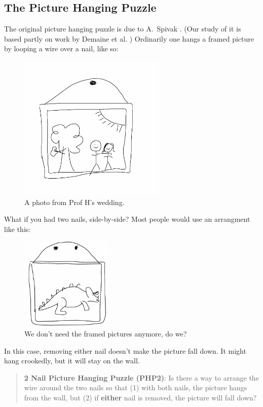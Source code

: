 \documentclass[12pt,letterpaper]{article}
\theoremstyle{definition}
\begin{document}
\subsection*{The Picture Hanging Puzzle}
The original picture hanging puzzle is due to A.~Spivak \cite{Spivak}.
(Our study of it is based partly on work by Demaine et al. \cite{Demaine})
Ordinarily one hangs a framed picture by looping a wire over a nail, like so:
\begin{figure}[h]
    \centering
    \includegraphics[height=2.75in]{phppics/wedding.png}
    \caption{A photo from Prof H's wedding.}
\end{figure}
 
\clearpage
 
What if you had two nails, side-by-side? 
Most people would use an arrangment like this:
\begin{figure}[ht]
    \centering
    \includegraphics[height=1.75in]{phppics/dinosaur}
    \caption{We don't need the framed pictures anymore, do we?}
\end{figure}

In this case, removing either nail doesn't make the picture fall down. 
It might hang crookedly, but it will stay on the wall.

\begin{quotation}
\textbf{2 Nail Picture Hanging Puzzle (PHP2)}:
Is there a way to arrange the wire around the two nails so that (1) with both nails, the picture hangs from the wall, but (2) if \textbf{either} nail is removed, the picture will fall down?
\end{quotation}
\end{document}
